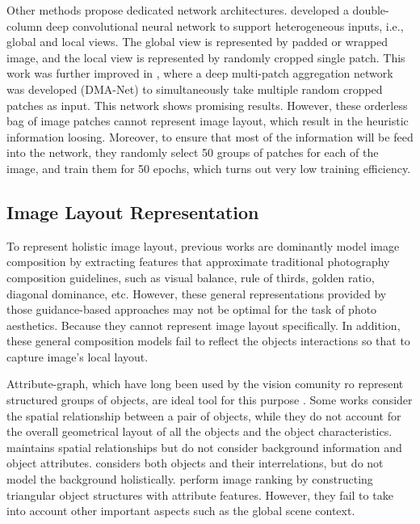 \documentclass[10pt,twocolumn,letterpaper]{article}
\begin{document}
Other methods propose dedicated network architectures. \cite{Lu:2014:ACMMM} developed a double-column deep convolutional neural network to support heterogeneous inputs, i.e., global and local views. The global view is represented by padded or wrapped image, and the local view is represented by randomly cropped single patch. This work was further improved in \cite{Lu:2015:ICCV}, where a deep multi-patch aggregation network was developed (DMA-Net) to simultaneously take multiple random cropped patches as input. This network shows promising results. However, these orderless bag of image patches cannot represent image layout, which result in the heuristic information loosing. Moreover, to ensure that most of the information will be feed into the network, they randomly select 50 groups of patches for each of the image, and train them for 50 epochs, which turns out very low training efficiency.

\subsection{Image Layout Representation}
To represent holistic image layout, previous works \cite{2010:ICIP:composition} \cite{2010:optimizingcomposition} \cite{2012:ICIP:composition} \cite{ICML:2012:composition} \cite{Yao:2012:oscar} are dominantly model image composition by extracting features that approximate traditional photography composition guidelines, such as visual balance, rule of thirds, golden ratio, diagonal dominance, etc. However, these general representations provided by those guidance-based approaches may not be optimal for the task of photo aesthetics. Because they cannot represent image layout specifically. In addition, these general composition models fail to reflect the objects interactions so that to capture image's local layout.

Attribute-graph, which have long been used by the vision comunity ro represent structured groups of objects, are ideal tool for this purpose \cite{Felzenszwalb:2004:graph-seg} \cite{Lu:2014:graph} \cite{CVPR:2014:multigraph} \cite{Shi:2000:PAMI:graph}.
Some works \cite{Lan:2012:ECCV:retrieval} consider the spatial relationship between a pair of objects, while they do not account for the overall geometrical layout of all the objects and the object characteristics. \cite{Xu:2010:SIGAPH:concep_map} maintains spatial relationships but do not consider background information and object attributes. \cite{2013:PAMI:description} considers both objects and their interrelations, but do not model the background holistically. \cite{Cao:2014:ACMMM:layout} perform image ranking by constructing triangular object structures with attribute features. However, they fail to take into account other important aspects such as the global scene context.
\end{document}
